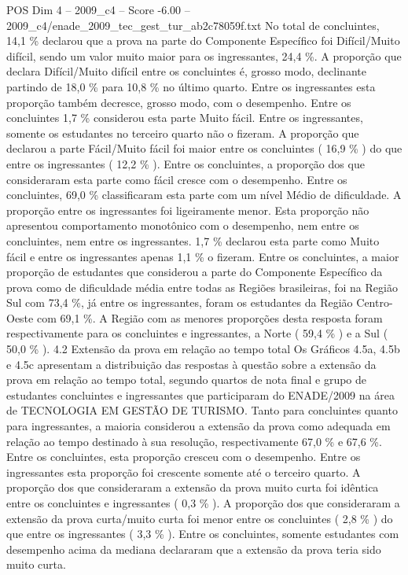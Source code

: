 \begin{textsample}{POS Dim 4 – 2009\_c4 – Score -6.00 – 2009\_c4/enade\_2009\_tec\_gest\_tur\_ab2c78059f.txt}
No total de concluintes, 14,1 \% declarou que a prova na parte do Componente Específico foi Difícil/Muito difícil, sendo um valor muito maior para os ingressantes, 24,4 \%.
A proporção que declara Difícil/Muito difícil entre os concluintes é, grosso modo, declinante partindo de 18,0 \% para 10,8 \% no último quarto.
Entre os ingressantes esta proporção também decresce, grosso modo, com o desempenho.
Entre os concluintes 1,7 \% considerou esta parte Muito fácil.
Entre os ingressantes, somente os estudantes no terceiro quarto não o fizeram.
A proporção que declarou a parte Fácil/Muito fácil foi maior entre os concluintes ( 16,9 \% ) do que entre os ingressantes ( 12,2 \% ).
Entre os concluintes, a proporção dos que consideraram esta parte como fácil cresce com o desempenho.
Entre os concluintes, 69,0 \% classificaram esta parte com um nível Médio de dificuldade.
A proporção entre os ingressantes foi ligeiramente menor.
Esta proporção não apresentou comportamento monotônico com o desempenho, nem entre os concluintes, nem entre os ingressantes. 1,7 \% declarou esta parte como Muito fácil e entre os ingressantes apenas 1,1 \% o fizeram.
Entre os concluintes, a maior proporção de estudantes que considerou a parte do Componente Específico da prova como de dificuldade média entre todas as Regiões brasileiras, foi na Região Sul com 73,4 \%, já entre os ingressantes, foram os estudantes da Região Centro-Oeste com 69,1 \%.
A Região com as menores proporções desta resposta foram respectivamente para os concluintes e ingressantes, a Norte ( 59,4 \% ) e a Sul ( 50,0 \% ). 4.2 Extensão da prova em relação ao tempo total Os Gráficos 4.5a, 4.5b e 4.5c apresentam a distribuição das respostas à questão sobre a extensão da prova em relação ao tempo total, segundo quartos de nota final e grupo de estudantes concluintes e ingressantes que participaram do ENADE/2009 na área de TECNOLOGIA EM GESTÃO DE TURISMO.
Tanto para concluintes quanto para ingressantes, a maioria considerou a extensão da prova como adequada em relação ao tempo destinado à sua resolução, respectivamente 67,0 \% e 67,6 \%.
Entre os concluintes, esta proporção cresceu com o desempenho.
Entre os ingressantes esta proporção foi crescente somente até o terceiro quarto.
A proporção dos que consideraram a extensão da prova muito curta foi idêntica entre os concluintes e ingressantes ( 0,3 \% ).
A proporção dos que consideraram a extensão da prova curta/muito curta foi menor entre os concluintes ( 2,8 \% ) do que entre os ingressantes ( 3,3 \% ).
Entre os concluintes, somente estudantes com desempenho acima da mediana declararam que a extensão da prova teria sido muito curta.

\end{textsample}
